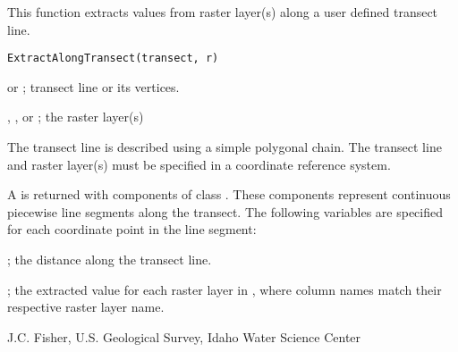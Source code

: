 \documentclass[letterpaper]{book}
\begin{document}
%
\begin{Description}\relax
This function extracts values from raster layer(s) along a user defined transect line.
\end{Description}
%
\begin{Usage}
\begin{verbatim}
ExtractAlongTransect(transect, r)
\end{verbatim}
\end{Usage}
%
\begin{Arguments}
\begin{ldescription}
\item[\code{transect}]  or ; transect line or its vertices.
\item[\code{r}] , , or ; the raster layer(s)
\end{ldescription}
\end{Arguments}
%
\begin{Details}\relax
The transect line is described using a simple polygonal chain.
The transect line and raster layer(s) must be specified in a coordinate reference system.
\end{Details}
%
\begin{Value}
A  is returned with components of class .
These components represent continuous piecewise line segments along the transect.
The following variables are specified for each coordinate point in the line segment:
\begin{ldescription}
\item[\code{dist}] ; the distance along the transect line.
\item[\code{2, ..., n}] ; the extracted value for each raster layer in , where column names match their respective raster layer name.
\end{ldescription}
\end{Value}
%
\begin{Author}\relax
J.C. Fisher, U.S. Geological Survey, Idaho Water Science Center
\end{Author}
%
\begin{SeeAlso}\relax
{}
\end{SeeAlso}
%
\end{document}
